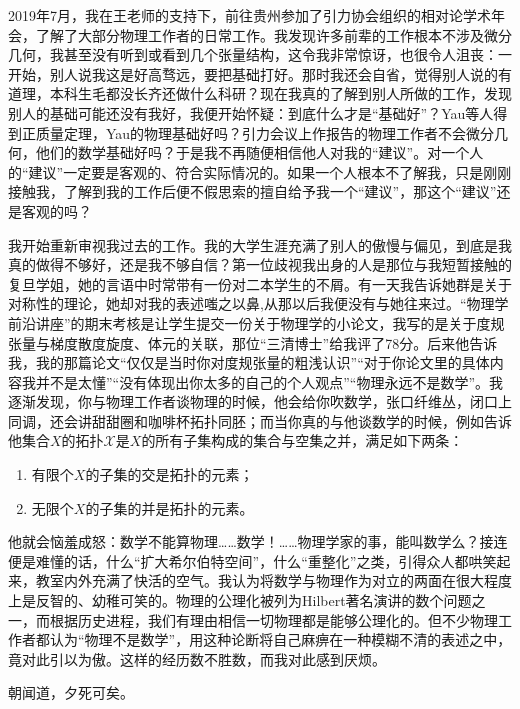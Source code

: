 	    2019年7月，我在王老师的支持下，前往贵州参加了引力协会组织的相对论学术年会，了解了大部分物理工作者的日常工作。我发现许多前辈的工作根本不涉及微分几何，我甚至没有听到或看到几个张量结构，这令我非常惊讶，也很令人沮丧：一开始，别人说我这是好高骛远，要把基础打好。那时我还会自省，觉得别人说的有道理，本科生毛都没长齐还做什么科研？现在我真的了解到别人所做的工作，发现别人的基础可能还没有我好，我便开始怀疑：到底什么才是“基础好”？Yau等人得到正质量定理，Yau的物理基础好吗？引力会议上作报告的物理工作者不会微分几何，他们的数学基础好吗？于是我不再随便相信他人对我的“建议”。对一个人的“建议”一定要是客观的、符合实际情况的。如果一个人根本不了解我，只是刚刚接触我，了解到我的工作后便不假思索的擅自给予我一个“建议”，那这个“建议”还是客观的吗？

	    我开始重新审视我过去的工作。我的大学生涯充满了别人的傲慢与偏见，到底是我真的做得不够好，还是我不够自信？第一位歧视我出身的人是那位与我短暂接触的复旦学姐，她的言语中时常带有一份对二本学生的不屑。有一天我告诉她群是关于对称性的理论，她却对我的表述嗤之以鼻,从那以后我便没有与她往来过。“物理学前沿讲座”的期末考核是让学生提交一份关于物理学的小论文，我写的是关于度规张量与梯度散度旋度、体元的关联，那位“三清博士”给我评了78分。后来他告诉我，我的那篇论文“仅仅是当时你对度规张量的粗浅认识”“对于你论文里的具体内容我并不是太懂”“没有体现出你太多的自己的个人观点”“物理永远不是数学”。我逐渐发现，你与物理工作者谈物理的时候，他会给你吹数学，张口纤维丛，闭口上同调，还会讲甜甜圈和咖啡杯拓扑同胚；而当你真的与他谈数学的时候，例如告诉他集合$X$的拓扑$\mathcal{X}$是$X$的所有子集构成的集合与空集之并，满足如下两条：
	    \begin{enumerate}
		    \item 有限个$X$的子集的交是拓扑的元素；
		    \item 无限个$X$的子集的并是拓扑的元素。
	    \end{enumerate}
	    他就会恼羞成怒：数学不能算物理……数学！……物理学家的事，能叫数学么？接连便是难懂的话，什么“扩大希尔伯特空间”，什么“重整化”之类，引得众人都哄笑起来，教室内外充满了快活的空气。我认为将数学与物理作为对立的两面在很大程度上是反智的、幼稚可笑的。物理的公理化被列为Hilbert著名演讲的数个问题之一，而根据历史进程，我们有理由相信一切物理都是能够公理化的。但不少物理工作者都认为“物理不是数学”，用这种论断将自己麻痹在一种模糊不清的表述之中，竟对此引以为傲。这样的经历数不胜数，而我对此感到厌烦。
		
		

        朝闻道，夕死可矣。

